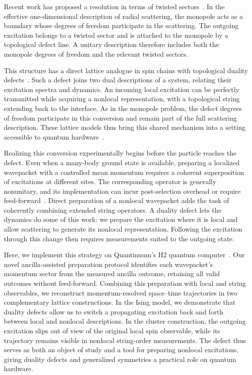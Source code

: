 Recent work has proposed a resolution in terms of twisted sectors~\cite{van_beest_fermion-monopole_2024,van_beest_monopoles_2025,loladze_monopole-fermion_2025,loladze_dynamics_2025}. In the effective one-dimensional description of radial scattering, the monopole acts as a boundary whose degrees of freedom participate in the scattering. The outgoing excitation belongs to a twisted sector and is attached to the monopole by a topological defect line. A unitary description therefore includes both the monopole degrees of freedom and the relevant twisted sectors.

This structure has a direct lattice analogue in spin chains with topological duality defects~\cite{ueda2025,Ueda:2026wvc,aasen2016topological}. Such a defect joins two dual descriptions of a system, relating their excitation spectra and dynamics. An incoming local excitation can be perfectly transmitted while acquiring a nonlocal representation, with a topological string extending back to the interface. As in the monopole problem, the defect degrees of freedom participate in this conversion and remain part of the full scattering description. These lattice models thus bring this shared mechanism into a setting accessible to quantum hardware~\cite{samanta2025dualitytwist}.

Realizing this conversion experimentally begins before the particle reaches the defect. Even when a many-body ground state is available, preparing a localized wavepacket with a controlled mean momentum requires a coherent superposition of excitations at different sites. The corresponding operator is generally nonunitary, and its implementation can incur post-selection overhead or require feed-forward~\cite{childs2012hamiltonian,turco2025creation,Gily_n_2019,mcardle2026quantum,o2025quantum,corcoles2021exploiting,pino2021demonstration,farrell2026digital,davoudi2024scattering}. Direct preparation of a nonlocal wavepacket adds the task of coherently combining extended string operators. A duality defect lets the dynamics do some of this work: we prepare the excitation where it is local and allow scattering to generate its nonlocal representation. Following the excitation through this change then requires measurements suited to the outgoing state.

Here, we implement this strategy on Quantinuum's H2 quantum computer~\cite{PhysRevX.13.041052}. Our novel ancilla-assisted preparation protocol identifies each wavepacket's momentum sector from the measured ancilla outcome, retaining all valid outcomes without feed-forward. Combining this preparation with local and string observables, we reconstruct momentum-resolved space--time trajectories in two complementary lattice constructions. In the Ising model, we demonstrate that duality defects allow us to switch a propagating excitation back and forth between local and nonlocal descriptions. In the cluster construction, the outgoing excitation slips out of view of the original local spin observable, while its trajectory remains visible in nonlocal string-order measurements. The defect thus serves as both an object of study and a tool for preparing nonlocal excitations, giving duality defects and generalized symmetries a practical role on quantum hardware.

